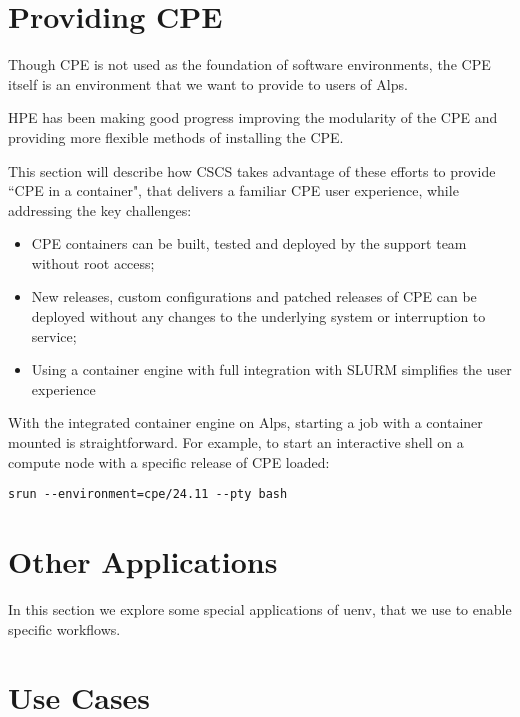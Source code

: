 \section{Providing CPE}
\label{sec:cpe}

Though CPE is not used as the foundation of software environments, the CPE itself is an environment that we want to provide to users of Alps.

HPE has been making good progress improving the modularity of the CPE and providing more flexible methods of installing the CPE.

This section will describe how CSCS takes advantage of these efforts to provide ``CPE in a container", that delivers a familiar CPE user experience, while addressing the key challenges:

\begin{itemize}
\item CPE containers can be built, tested and deployed by the support team without root access;
\item New releases, custom configurations and patched releases of CPE can be deployed without any changes to the underlying system or interruption to service;
\item Using a container engine with full integration with SLURM simplifies the user experience
\end{itemize}

With the integrated container engine on Alps, starting a job with a container mounted is straightforward.
For example, to start an interactive shell on a compute node with a specific release of CPE loaded:
\begin{lstlisting}
srun --environment=cpe/24.11 --pty bash
\end{lstlisting}

\section{Other Applications}

In this section we explore some special applications of uenv, that we use to enable specific workflows.

\section{Use Cases}
\label{sec:usecases}

